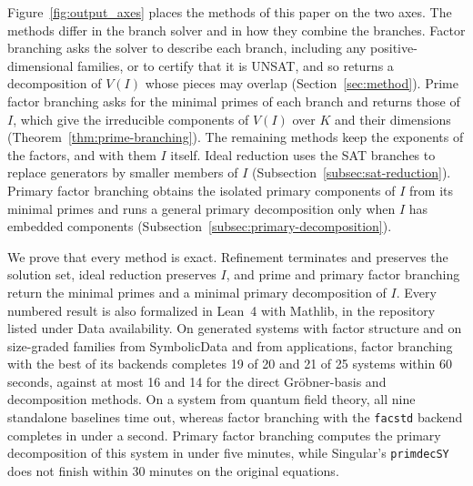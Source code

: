 Figure~\ref{fig:output_axes} places the methods of this paper on the two axes.
The methods differ in the branch solver and in how they combine the branches.
Factor branching asks the solver to describe each branch, including any
positive-dimensional families, or to certify that it is UNSAT, and so returns
a decomposition of $V(I)$ whose pieces may overlap
(Section~\ref{sec:method}). Prime factor
branching asks for the minimal primes of each branch and returns those of
$I$, which give the irreducible components of $V(I)$ over $K$ and their
dimensions
(Theorem~\ref{thm:prime-branching}). The remaining methods keep the exponents
of the factors, and with them $I$ itself. Ideal reduction uses the SAT
branches to replace generators by smaller members of $I$
(Subsection~\ref{subsec:sat-reduction}). Primary factor branching obtains the
isolated primary components of $I$ from its minimal primes and runs a general
primary decomposition only when $I$ has embedded components
(Subsection~\ref{subsec:primary-decomposition}).

We prove that every method is exact. Refinement terminates and preserves the
solution set, ideal reduction preserves $I$,
and prime and primary factor branching return the
minimal primes and a minimal primary decomposition of $I$. Every numbered
result is also formalized in Lean~4 with Mathlib, in the repository listed
under Data availability. On generated systems with factor structure and on
size-graded families from SymbolicData and from applications, factor
branching with the best of its backends completes 19 of 20 and 21 of 25
systems within 60 seconds, against at most 16 and 14 for the direct
Gr\"obner-basis and decomposition methods. On a system from quantum field
theory, all nine standalone baselines time out, whereas factor branching with
the \texttt{facstd} backend completes in under a second. Primary factor
branching computes the primary decomposition of this system in under five
minutes, while Singular's \texttt{primdecSY} does not finish within 30
minutes on the original equations.
